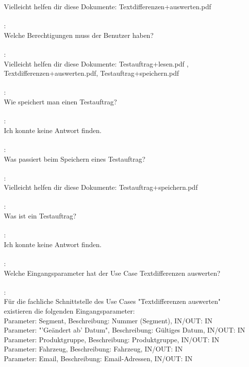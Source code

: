 Vielleicht helfen dir diese Dokumente: Textdifferenzen+auswerten.pdf \\\\
\speaker{\EvaHaegele}: \\
Welche Berechtigungen muss der Benutzer haben? \\\\
\speaker{\Chatbot}: \\
Vielleicht helfen dir diese Dokumente: Testauftrag+lesen.pdf , Textdifferenzen+auswerten.pdf, Testauftrag+speichern.pdf \\\\
\speaker{\EvaHaegele}: \\
Wie speichert man einen Testauftrag? \\\\
\speaker{\Chatbot}: \\
Ich konnte keine Antwort finden. \\\\
\speaker{\EvaHaegele}: \\
Was passiert beim Speichern eines Testauftrag? \\\\
\speaker{\Chatbot}: \\
Vielleicht helfen dir diese Dokumente: Testauftrag+speichern.pdf \\\\
\speaker{\EvaHaegele}: \\
Was ist ein Testauftrag? \\\\
\speaker{\Chatbot}: \\
Ich konnte keine Antwort finden. \\\\
\speaker{\EvaHaegele}: \\
Welche Eingangsparameter hat der Use Case Textdifferenzen auswerten? \\\\
\speaker{\Chatbot}: \\
Für die fachliche Schnittstelle des Use Cases "Textdifferenzen auswerten" existieren die folgenden Eingangsparameter: \\
Parameter: Segment, Beschreibung: Nummer (Segment), IN/OUT: IN \\
Parameter: "'Geändert ab' Datum", Beschreibung: Gültiges Datum, IN/OUT: IN \\
Parameter: Produktgruppe, Beschreibung: Produktgruppe, IN/OUT: IN \\
Parameter: Fahrzeug, Beschreibung: Fahrzeug, IN/OUT: IN \\
Parameter: Email, Beschreibung: Email-Adressen, IN/OUT: IN \\

